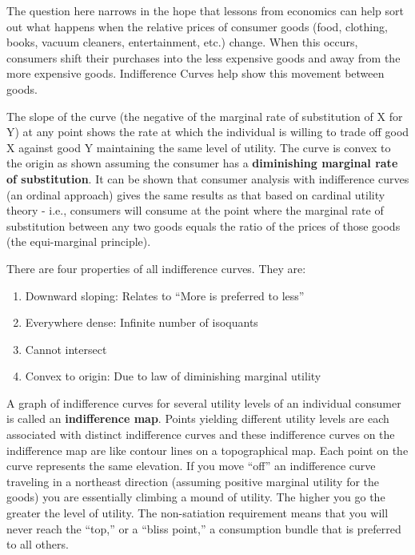 \documentclass[11pt,]{book}
\providecommand{\tightlist}{%
  \setlength{\itemsep}{0pt}\setlength{\parskip}{0pt}}
\theoremstyle{definition}
\theoremstyle{definition}
\theoremstyle{definition}
\theoremstyle{remark}
\begin{document}
The question here narrows in the hope that lessons from economics can
help sort out what happens when the relative prices of consumer goods
(food, clothing, books, vacuum cleaners, entertainment, etc.) change.
When this occurs, consumers shift their purchases into the less
expensive goods and away from the more expensive goods. Indifference
Curves help show this movement between goods.

The slope of the curve (the negative of the marginal rate of
substitution of X for Y) at any point shows the rate at which the
individual is willing to trade off good X against good Y maintaining the
same level of utility. The curve is convex to the origin as shown
assuming the consumer has a \textbf{diminishing marginal rate of
substitution}. It can be shown that consumer analysis with indifference
curves (an ordinal approach) gives the same results as that based on
cardinal utility theory - i.e., consumers will consume at the point
where the marginal rate of substitution between any two goods equals the
ratio of the prices of those goods (the equi-marginal principle).

There are four properties of all indifference curves. They are:

\begin{enumerate}
\def\labelenumi{\arabic{enumi}.}
\tightlist
\item
  Downward sloping: Relates to ``More is preferred to less''
\item
  Everywhere dense: Infinite number of isoquants
\item
  Cannot intersect
\item
  Convex to origin: Due to law of diminishing marginal utility
\end{enumerate}

A graph of indifference curves for several utility levels of an
individual consumer is called an \textbf{indifference map}. Points
yielding different utility levels are each associated with distinct
indifference curves and these indifference curves on the indifference
map are like contour lines on a topographical map. Each point on the
curve represents the same elevation. If you move ``off'' an indifference
curve traveling in a northeast direction (assuming positive marginal
utility for the goods) you are essentially climbing a mound of utility.
The higher you go the greater the level of utility. The non-satiation
requirement means that you will never reach the ``top,'' or a ``bliss
point,'' a consumption bundle that is preferred to all others.
\end{document}

